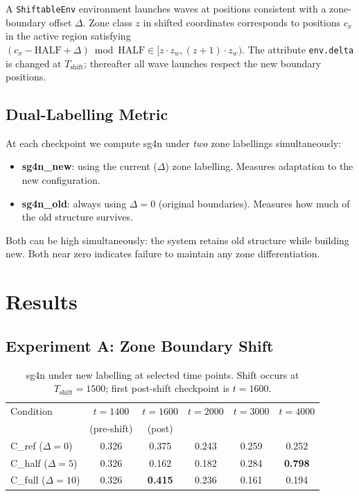 \documentclass[11pt]{article}
\begin{document}
A \texttt{ShiftableEnv} environment launches waves at positions consistent with a
zone-boundary offset $\Delta$.
Zone class $z$ in shifted coordinates corresponds to positions $c_x$ in the active region
satisfying $(c_x - \mathrm{HALF} + \Delta) \bmod \mathrm{HALF} \in [z \cdot z_w,
(z+1) \cdot z_w)$.
The attribute \texttt{env.delta} is changed at $T_\mathrm{shift}$;
thereafter all wave launches respect the new boundary positions.

\subsection{Dual-Labelling Metric}

At each checkpoint we compute sg4n under \emph{two} zone labellings simultaneously:
\begin{itemize}
  \item \textbf{sg4n\_new}: using the current ($\Delta$) zone labelling.
        Measures adaptation to the new configuration.
  \item \textbf{sg4n\_old}: always using $\Delta=0$ (original boundaries).
        Measures how much of the old structure survives.
\end{itemize}
Both can be high simultaneously: the system retains old structure while building new.
Both near zero indicates failure to maintain any zone differentiation.

\section{Results}

\subsection{Experiment A: Zone Boundary Shift}

\begin{table}[h]
  \centering
  \caption{sg4n under new labelling at selected time points.
           Shift occurs at $T_\mathrm{shift}=1500$; first post-shift checkpoint is $t=1600$.}
  \label{tab:expa}
  \small
  \begin{tabular}{lccccc}
    \toprule
    Condition & $t=1400$ & $t=1600$ & $t=2000$ & $t=3000$ & $t=4000$ \\
              & (pre-shift) & (post) & & & \\
    \midrule
    C\_ref  ($\Delta=0$)  & 0.326 & 0.375 & 0.243 & 0.259 & 0.252 \\
    C\_half ($\Delta=5$)  & 0.326 & 0.162 & 0.182 & 0.284 & \textbf{0.798} \\
    C\_full ($\Delta=10$) & 0.326 & \textbf{0.415} & 0.236 & 0.161 & 0.194 \\
    \bottomrule
  \end{tabular}
\end{table}
\end{document}
